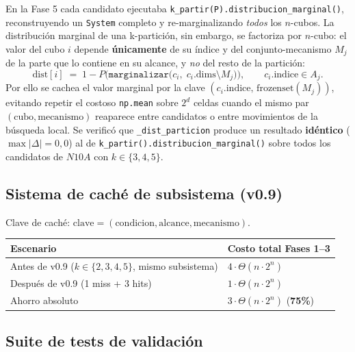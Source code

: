 \documentclass[12pt,letterpaper]{article}
\theoremstyle{definition}
\theoremstyle{remark}
\newcommand{\BigTheta}[1]{\Theta(#1)}
\begin{document}
En la Fase 5 cada candidato ejecutaba
\texttt{k\_partir(P).distribucion\_marginal()}, reconstruyendo un \texttt{System}
completo y re-marginalizando \emph{todos} los $n$-cubos. La distribución marginal de una
k-partición, sin embargo, se factoriza por $n$-cubo: el valor del cubo $i$ depende
\textbf{únicamente} de su índice y del conjunto-mecanismo $M_j$ de la parte que lo
contiene en su alcance, y \emph{no} del resto de la partición:
\begin{equation}
  \mathrm{dist}[i] \;=\; 1 - P\!\Big(\texttt{marginalizar}\big(c_i,\; c_i.\mathrm{dims} \setminus M_j\big)\Big),
  \qquad c_i.\mathrm{indice} \in A_j .
\end{equation}
Por ello se cachea el valor marginal por la clave $(c_i.\mathrm{indice},\, \mathrm{frozenset}(M_j))$,
evitando repetir el costoso \texttt{np.mean} sobre $2^d$ celdas cuando el mismo par
$(\text{cubo},\text{mecanismo})$ reaparece entre candidatos o entre movimientos de la
búsqueda local. Se verificó que \texttt{\_dist\_particion} produce un resultado
\textbf{idéntico} ($\max|\Delta| = 0{,}0$) al de \texttt{k\_partir().distribucion\_marginal()}
sobre todos los candidatos de $N10A$ con $k \in \{3,4,5\}$.

\subsection{Sistema de caché de subsistema (v0.9)}

Clave de caché: $\mathrm{clave} = (\mathrm{condicion}, \mathrm{alcance}, \mathrm{mecanismo})$.

\begin{center}
\begin{tabular}{@{}l l@{}}
\toprule
\textbf{Escenario} & \textbf{Costo total Fases 1--3} \\
\midrule
Antes de v0.9 ($k \in \{2,3,4,5\}$, mismo subsistema) & $4 \cdot \BigTheta{n \cdot 2^n}$ \\
Después de v0.9 (1 miss + 3 hits) & $1 \cdot \BigTheta{n \cdot 2^n}$ \\
Ahorro absoluto & $3 \cdot \BigTheta{n \cdot 2^n}$ (\textbf{75\%}) \\
\bottomrule
\end{tabular}
\end{center}

\subsection{Suite de tests de validación}
\end{document}
